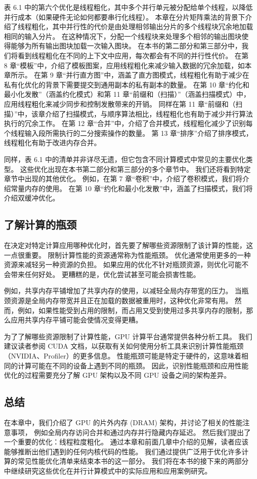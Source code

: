 表 6.1 中的第六个优化是线程粗化，其中多个并行单元被分配给单个线程，以降低并行成本（如果硬件无论如何都要串行化线程）。 
本章在分片矩阵乘法的背景下介绍了线程粗化，其中并行性的代价是由处理相邻输出分片的多个线程块冗余地加载相同的输入分片。 
在这种情况下，分配一个线程块来处理多个相邻的输出图块使得能够为所有输出图块加载一次输入图块。 
在本书的第二部分和第三部分中，我们将看到线程粗化在不同的上下文中应用，每次都会有不同的并行性代价。 
在第 8 章“模板”中，介绍了模板图案，应用线程粗化来减少输入数据的冗余加载，如本章所示。 
在第 9 章“并行直方图”中，涵盖了直方图模式，线程粗化有助于减少在私有化优化的背景下需要提交到通用副本的私有副本的数量。 
在第 10 章“约化和最小化发散”（涵盖约化模式）和第 11 章“前缀和（扫描）”（涵盖扫描模式）中，
应用线程粗化来减少同步和控制发散带来的开销。 
同样在第 11 章“前缀和（扫描）”中，该章介绍了扫描模式，与顺序算法相比，线程粗化也有助于减少并行算法执行的冗余工作。 
在第 12 章“合并”中，介绍了合并模式，线程粗化减少了识别每个线程输入段所需执行的二分搜索操作的数量。 
第 13 章“排序”介绍了排序模式，线程粗化有助于改进内存合并。

同样，表 6.1 中的清单并非详尽无遗，但它包含不同计算模式中常见的主要优化类型。 
这些优化出现在本书第二部分和第三部分的多个章节中。 我们还将看到特定章节中出现的其他优化。 
例如，在第 7 章“卷积”中，介绍了卷积模式，我们将介绍常量内存的使用。 
在第 10 章“约化和最小化发散”中，涵盖了扫描模式，我们将介绍双缓冲优化。

\subsection{了解计算的瓶颈}
在决定对特定计算应用哪种优化时，首先要了解哪些资源限制了该计算的性能，这一点很重要。 
限制计算性能的资源通常称为性能瓶颈。 优化通常使用更多的一种资源来减轻另一种资源的负担。 
如果应用的优化不针对瓶颈资源，则优化可能不会带来任何好处。 更糟糕的是，优化尝试甚至可能会损害性能。

例如，共享内存平铺增加了共享内存的使用，以减轻全局内存带宽的压力。 
当瓶颈资源是全局内存带宽并且正在加载的数据被重用时，这种优化非常有用。 
然而，例如，如果性能受到占用的限制，而占用又受到使用过多共享内存的限制，那么应用共享内存平铺可能会使情况变得更糟。

为了了解哪些资源限制了计算性能，GPU 计算平台通常提供各种分析工具。 
我们建议读者参阅 CUDA 文档，以获取有关如何使用分析工具来识别计算性能瓶颈（NVIDIA、Profiler）的更多信息。 
性能瓶颈可能是特定于硬件的，这意味着相同的计算可能在不同的设备上遇到不同的瓶颈。 
因此，识别性能瓶颈和应用性能优化的过程需要充分了解 GPU 架构以及不同 GPU 设备之间的架构差异。

\subsection{总结}
在本章中，我们介绍了 GPU 的片外内存 (DRAM) 架构，并讨论了相关的性能注意事项，
例如全局内存访问合并和通过内存并行隐藏内存延迟。 然后我们提出了一个重要的优化：线程粒度粗化。 
通过本章和前面几章中介绍的见解，读者应该能够推断出他们遇到的任何内核代码的性能。 
我们通过提供广泛用于优化许多计算的常见性能优化清单来结束本书的这一部分。 
我们将在本书的接下来的两部分中继续研究这些优化在并行计算模式中的实际应用和应用案例研究。

